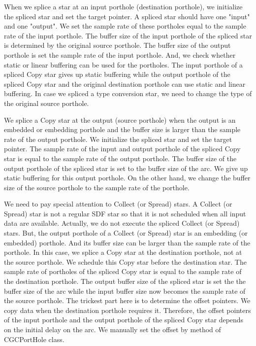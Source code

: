 {When we splice a star at an input porthole (destination porthole), we
initialize the spliced star and set the target pointer. A spliced star should
have one "input" and one "output". We set the sample rate of these portholes
equal to the sample rate of the input porthole. The buffer size of the input
porthole of the spliced star is determined by the original source porthole.
The buffer size of the output porthole is set the sample rate of the
input porthole. And, we check whether static or linear buffering can be used
for the portholes. The input porthole of a spliced Copy star gives up
static buffering while the output porthole of the spliced Copy star and
the original destination porthole can use static and linear buffering.
In case we spliced a type conversion star, we need to change the type of the
original source porthole.

We splice a Copy star at the output (source porthole) when the output 
is an embedded or
embedding porthole and the buffer size is larger than the sample rate of
the output porthole. We initialize the spliced star and set the target
pointer. The sample rate of the input and output porthole of
the spliced Copy star is equal to the sample rate of the output porthole.
The buffer size of the output porthole of the spliced star is set to the
buffer size of the arc. We give up static buffering for this output
porthole. On the other hand, we change the buffer size of
the source porthole to the sample rate of the porthole. 

We need to pay special attention to Collect (or Spread) stars. A Collect
(or Spread) star is not a regular SDF star so that it is not 
scheduled when all input data are available. Actually, we do not execute 
the spliced Collect (or Spread) stars.
But, the output porthole of a Collect (or Spread) star is an embedding
(or embedded) porthole. And
its buffer size can be larger than the sample rate of the porthole.
In this case, we splice a Copy star at the destination porthole, not
at the source porthole. We schedule this Copy star before the destination
star. The sample rate of portholes of the spliced Copy star is equal to
the sample rate of the destination porthole. The output buffer size
of the spliced star is set the the buffer size of the arc while the input
buffer size now becomes the sample rate of the source porthole. The
trickest part here is to determine the offset pointers. We copy data 
when the destination porthole requires it. Therefore, the offset pointers of
the input porthole and the output porthole of the spliced Copy star
depends on the initial delay on the arc. We manually set the offset by
 method of CGCPortHole class.

}
